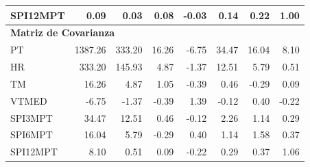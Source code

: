 \begin{table}[ht]
\begin{tabular}{lrrrrrrr}
SPI12MPT & 0.09 & 0.03 & 0.08 & -0.03 & 0.14 & 0.22 & 1.00 \\
\midrule
\multicolumn{8}{l}{\textbf{Matriz de Covarianza}} \\
\midrule
PT       & 1387.26 & 333.20 & 16.26 & -6.75 & 34.47 & 16.04 & 8.10 \\
HR       & 333.20 & 145.93 & 4.87 & -1.37 & 12.51 & 5.79 & 0.51 \\
TM       & 16.26 & 4.87 & 1.05 & -0.39 & 0.46 & -0.29 & 0.09 \\
VTMED    & -6.75 & -1.37 & -0.39 & 1.39 & -0.12 & 0.40 & -0.22 \\
SPI3MPT  & 34.47 & 12.51 & 0.46 & -0.12 & 2.26 & 1.14 & 0.29 \\
SPI6MPT  & 16.04 & 5.79 & -0.29 & 0.40 & 1.14 & 1.58 & 0.37 \\
SPI12MPT & 8.10 & 0.51 & 0.09 & -0.22 & 0.29 & 0.37 & 1.06 \\
\bottomrule
\end{tabular}
\end{table}







